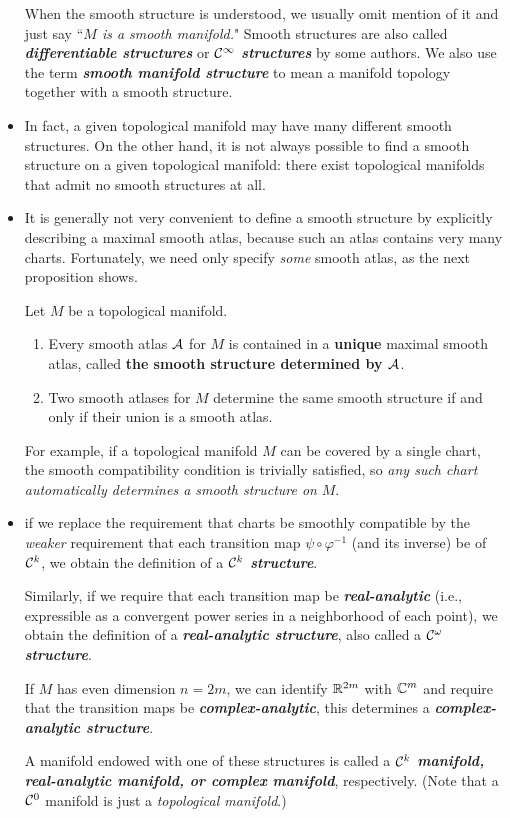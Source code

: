 \documentclass[11pt]{article}
\begin{document}
\begin{itemize}
\begin{definition}
When the smooth structure is understood, we usually omit mention of it and just say ``\emph{$M$ is a smooth manifold.}" Smooth structures are also called \emph{\textbf{differentiable structures}} or \textbf{\emph{${\mathcal C}^{\infty}$ structures}} by some authors. We also use the term \emph{\textbf{smooth manifold structure}} to mean a manifold topology together with a smooth structure.
\end{definition}

\item In fact, a given topological manifold may have many different smooth structures. On the other hand, it is not always possible to find a smooth structure on a given topological manifold: there exist topological manifolds that admit no smooth structures at all.

\item It is generally not very convenient to define a smooth structure by explicitly describing a maximal smooth atlas, because such an atlas contains very many charts. Fortunately, we need only specify \emph{some} smooth atlas, as the next proposition shows.
\begin{proposition}
Let $M$ be a topological manifold.
\begin{enumerate}
\item Every smooth atlas ${\mathcal A}$ for $M$ is contained in a \textbf{unique} maximal smooth atlas, called \textbf{the smooth structure determined by ${\mathcal A}$}.
\item Two smooth atlases for $M$ determine the same smooth structure if and only if their union is a smooth atlas.
\end{enumerate}
\end{proposition}
For example, if a topological manifold $M$ can be covered by a single chart, the smooth compatibility condition is trivially satisfied, so \emph{any such chart automatically determines a smooth structure on} $M$.

\item if we replace the requirement that charts be smoothly compatible by the \emph{weaker} requirement that each transition map $\psi \circ \varphi^{-1}$ (and its inverse) be of ${\mathcal C}^{k}$, we obtain the definition of a \emph{\textbf{${\mathcal C}^{k}$ structure}}. 

Similarly, if we require that each transition map be \emph{\textbf{real-analytic}} (i.e., expressible as a convergent power series in a neighborhood of each point), we obtain the definition of a \emph{\textbf{real-analytic structure}}, also called a \emph{\textbf{${\mathcal C}^{\omega}$ structure}}. 

If $M$ has even dimension $n = 2m$, we can identify ${\mathbb R}^{2m}$ with ${\mathbb C}^m$ and require that the transition maps be \emph{\textbf{complex-analytic}}, this determines a \emph{\textbf{complex-analytic structure}}. 

A manifold endowed with one of these structures is called a \emph{\textbf{${\mathcal C}^k$ manifold, real-analytic manifold, or complex manifold}}, respectively. (Note that a ${\mathcal C}^0$ manifold is just a \emph{topological manifold}.)
\end{itemize}
\end{document}
